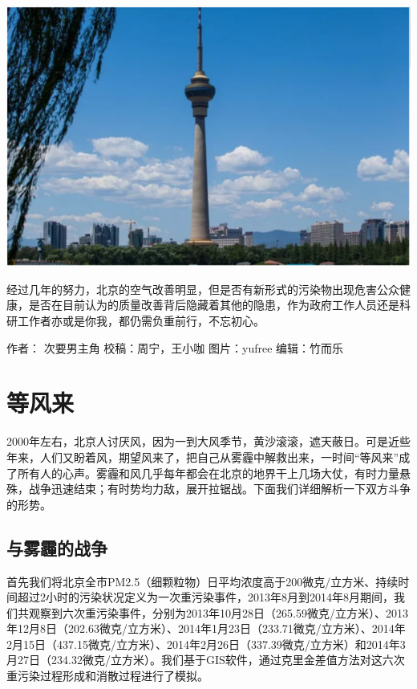 \documentclass[]{book}
\begin{document}
\includegraphics[width=8.33in]{images/air5}

经过几年的努力，北京的空气改善明显，但是否有新形式的污染物出现危害公众健康，是否在目前认为的质量改善背后隐藏着其他的隐患，作为政府工作人员还是科研工作者亦或是你我，都仍需负重前行，不忘初心。

作者： 次要男主角
校稿：周宁，王小咖
图片：yufree
编辑：竹而乐

\hypertarget{ux7b49ux98ceux6765}{%
\section{等风来}\label{ux7b49ux98ceux6765}}

2000年左右，北京人讨厌风，因为一到大风季节，黄沙滚滚，遮天蔽日。可是近些年来，人们又盼着风，期望风来了，把自己从雾霾中解救出来，一时间``等风来''成了所有人的心声。雾霾和风几乎每年都会在北京的地界干上几场大仗，有时力量悬殊，战争迅速结束；有时势均力敌，展开拉锯战。下面我们详细解析一下双方斗争的形势。

\hypertarget{ux4e0eux96feux973eux7684ux6218ux4e89}{%
\subsection{与雾霾的战争}\label{ux4e0eux96feux973eux7684ux6218ux4e89}}

首先我们将北京全市PM2.5（细颗粒物）日平均浓度高于200微克/立方米、持续时间超过2小时的污染状况定义为一次重污染事件，2013年8月到2014年8月期间，我们共观察到六次重污染事件，分别为2013年10月28日（265.59微克/立方米）、2013年12月8日（202.63微克/立方米）、2014年1月23日（233.71微克/立方米）、2014年2月15日（437.15微克/立方米）、2014年2月26日（337.39微克/立方米）和2014年3月27日（234.32微克/立方米）。我们基于GIS软件，通过克里金差值方法对这六次重污染过程形成和消散过程进行了模拟。
\end{document}
